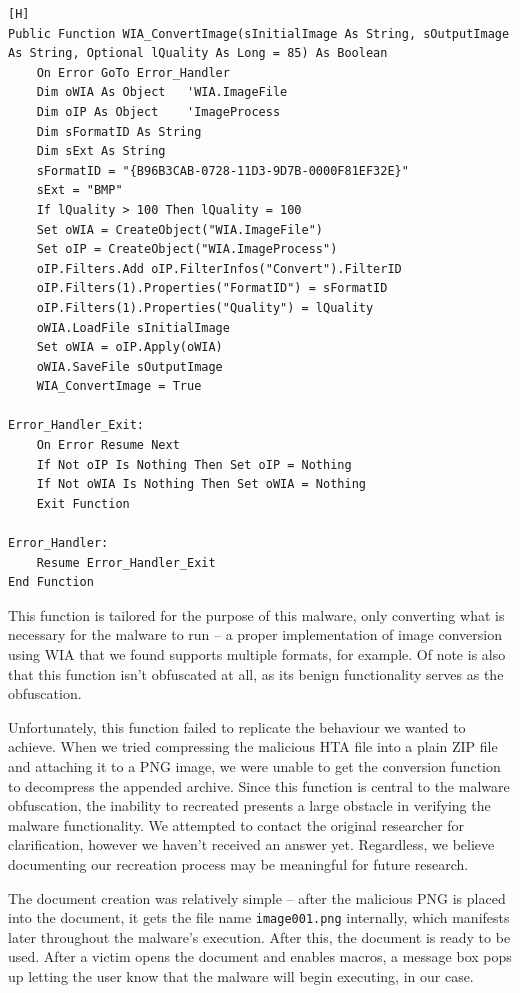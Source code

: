 \begin{lstlisting}[language=VBScript, caption={The image conversion function obtained from a source code dump.}][H]
Public Function WIA_ConvertImage(sInitialImage As String, sOutputImage As String, Optional lQuality As Long = 85) As Boolean
    On Error GoTo Error_Handler
    Dim oWIA As Object   'WIA.ImageFile
    Dim oIP As Object    'ImageProcess
    Dim sFormatID As String
    Dim sExt As String
    sFormatID = "{B96B3CAB-0728-11D3-9D7B-0000F81EF32E}"
    sExt = "BMP"
    If lQuality > 100 Then lQuality = 100
    Set oWIA = CreateObject("WIA.ImageFile")
    Set oIP = CreateObject("WIA.ImageProcess")
    oIP.Filters.Add oIP.FilterInfos("Convert").FilterID
    oIP.Filters(1).Properties("FormatID") = sFormatID
    oIP.Filters(1).Properties("Quality") = lQuality
    oWIA.LoadFile sInitialImage
    Set oWIA = oIP.Apply(oWIA)
    oWIA.SaveFile sOutputImage
    WIA_ConvertImage = True

Error_Handler_Exit:
    On Error Resume Next
    If Not oIP Is Nothing Then Set oIP = Nothing
    If Not oWIA Is Nothing Then Set oWIA = Nothing
    Exit Function

Error_Handler:
    Resume Error_Handler_Exit
End Function
\end{lstlisting}

This function is tailored for the purpose of this malware, only converting what is necessary for the malware to run -- 
a proper implementation of image conversion using \acrshort{WIA} that we found supports multiple formats, for example. 
Of note is also that this function isn't obfuscated at all, as its benign functionality serves as the obfuscation. 

Unfortunately, this function failed to replicate the behaviour we wanted to achieve. When we tried compressing the
malicious \acrfull{HTA} file into a plain ZIP file and attaching it to a \acrshort{PNG} image, we were unable to get the conversion
function to decompress the appended archive. Since this function is central to the malware obfuscation, the inability to
recreated presents a large obstacle in verifying the malware functionality. We attempted to contact the original
researcher for clarification, however we haven't received an answer yet. %
Regardless, we believe documenting our recreation process may be meaningful for future research.

The document creation was relatively simple -- after the malicious \acrshort{PNG} is placed into the document, it gets
the file name \verb+image001.png+ internally, which manifests later throughout the malware's execution. After this, the
document is ready to be used. After a victim opens the document and enables macros, a message box pops up letting the
user know that the malware will begin executing, in our case.

